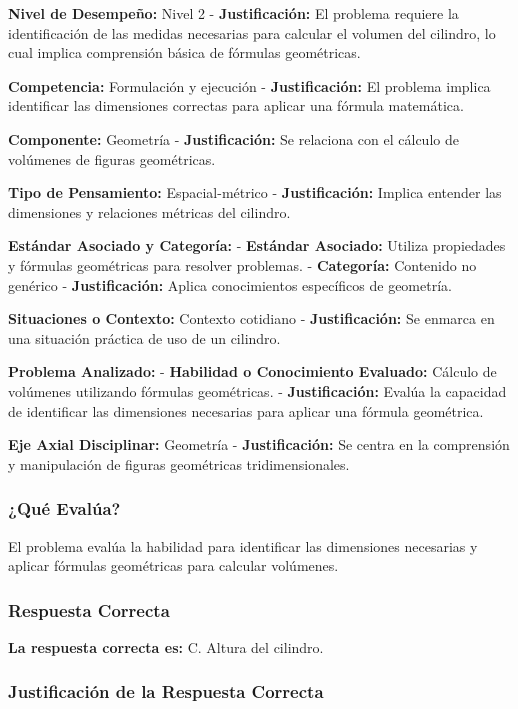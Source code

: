 \documentclass[
]{article}
\begin{document}
\textbf{Nivel de Desempeño:} Nivel 2 - \textbf{Justificación:} El
problema requiere la identificación de las medidas necesarias para
calcular el volumen del cilindro, lo cual implica comprensión básica de
fórmulas geométricas.

\textbf{Competencia:} Formulación y ejecución - \textbf{Justificación:}
El problema implica identificar las dimensiones correctas para aplicar
una fórmula matemática.

\textbf{Componente:} Geometría - \textbf{Justificación:} Se relaciona
con el cálculo de volúmenes de figuras geométricas.

\textbf{Tipo de Pensamiento:} Espacial-métrico - \textbf{Justificación:}
Implica entender las dimensiones y relaciones métricas del cilindro.

\textbf{Estándar Asociado y Categoría:} - \textbf{Estándar Asociado:}
Utiliza propiedades y fórmulas geométricas para resolver problemas. -
\textbf{Categoría:} Contenido no genérico - \textbf{Justificación:}
Aplica conocimientos específicos de geometría.

\textbf{Situaciones o Contexto:} Contexto cotidiano -
\textbf{Justificación:} Se enmarca en una situación práctica de uso de
un cilindro.

\textbf{Problema Analizado:} - \textbf{Habilidad o Conocimiento
Evaluado:} Cálculo de volúmenes utilizando fórmulas geométricas. -
\textbf{Justificación:} Evalúa la capacidad de identificar las
dimensiones necesarias para aplicar una fórmula geométrica.

\textbf{Eje Axial Disciplinar:} Geometría - \textbf{Justificación:} Se
centra en la comprensión y manipulación de figuras geométricas
tridimensionales.

\subsubsection{¿Qué Evalúa?}\label{quuxe9-evaluxfaa}

El problema evalúa la habilidad para identificar las dimensiones
necesarias y aplicar fórmulas geométricas para calcular volúmenes.

\subsubsection{Respuesta Correcta}\label{respuesta-correcta}

\textbf{La respuesta correcta es:} C. Altura del cilindro.

\subsubsection{Justificación de la Respuesta
Correcta}\label{justificaciuxf3n-de-la-respuesta-correcta}
\end{document}
